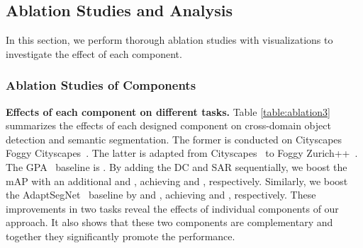\documentclass[10pt,journal,compsoc]{IEEEtran}
\begin{document}
\subsection{Ablation Studies and Analysis}
\label{sec:ablation}
In this section, we perform thorough ablation studies with visualizations to investigate the effect of each component. 
\subsubsection{Ablation Studies of Components}

\noindent \textbf{Effects of each component on different tasks.} 
Table \ref{table:ablation3} summarizes the effects of each designed component on cross-domain object detection and semantic segmentation. The former is conducted on  Cityscapes~\cite{cordts2016cityscapes}   Foggy Cityscapes~\cite{FoggyCity}. The latter is adapted from Cityscapes~\cite{cordts2016cityscapes} to Foggy Zurich++~\cite{FoggyCity,FoggyDriving}. 
The GPA~\cite{GPA} baseline is .  By adding the DC and SAR sequentially, we boost the mAP with an additional  and , achieving  and , respectively. Similarly, we boost the AdaptSegNet~\cite{AdaptSegNet} baseline by  and , achieving  and , respectively.
These improvements in two tasks reveal the effects of individual components of our approach. It also shows that these two components are complementary and together they significantly promote the performance.

\begin{table}[t]
\caption{
Ablation study of each component on two tasks.
}
\label{table:ablation3}
\centering
{}
\end{table}
\end{document}
